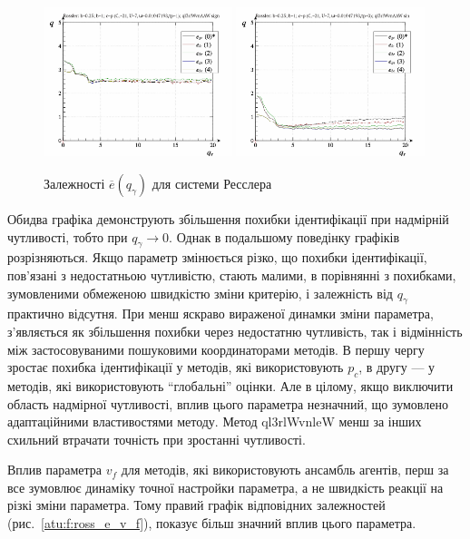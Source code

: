 \begin{figure}[ht!]
\begin{center}
  \includegraphics[width=0.49\textwidth]{p/cha/ross/ross_id-p_q_gamma_ql3rlWvnAAW_sign.png}
  \hfill
  \includegraphics[width=0.49\textwidth]{p/cha/ross/ross_id-p_q_gamma_ql3rlWvnAAW_sin.png}
\end{center}
\caption{Залежності $ \overline{e} (q_\gamma) $ для системи Ресслера}
\label{atu:f:ross_e_q_gamma}
\end{figure}

Обидва графіка демонструють збільшення похибки ідентифікації
при надмірній чутливості, тобто при
$ q_\gamma \to 0 $. Однак в подальшому поведінку графіків
розрізняються. Якщо параметр змінюється різко, що похибки
ідентифікації, пов'язані з недостатньою чутливістю, стають
малими, в порівнянні з похибками, зумовленими обмеженою
швидкістю зміни критерію, і залежність від
$ q_\gamma $ практично відсутня. При менш яскраво вираженої динамки
зміни параметра, з'являється як збільшення похибки через
недостатню чутливість, так і відмінність між застосовуваними
пошуковими координаторами методів. В першу чергу зростає
похибка ідентифікації у методів, які використовують
$p_c$, в другу --- у методів, які використовують ``глобальні'' оцінки.
Але в цілому, якщо виключити область надмірної
чутливості, вплив цього параметра незначний, що зумовлено
адаптаційними властивостями методу. Метод ql3rlWvnleW менш за інших
схильний втрачати точність при зростанні чутливості.

Вплив параметра
$ v_f $ для методів, які використовують ансамбль агентів, перш за
все зумовлює динаміку точної настройки параметра, а не швидкість
реакції на різкі зміни параметра. Тому правий графік відповідних
залежностей (рис.~\ref{atu:f:ross_e_v_f}), показує більш значний вплив
цього параметра.


